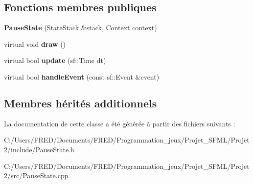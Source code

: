 \subsection*{Fonctions membres publiques}
\begin{DoxyCompactItemize}
\item 
{\bfseries Pause\+State} (\hyperlink{class_state_stack}{State\+Stack} \&stack, \hyperlink{struct_state_1_1_context}{Context} context)\hypertarget{class_pause_state_ac5c14226e18f688233f5b511e1025a59}{}\label{class_pause_state_ac5c14226e18f688233f5b511e1025a59}

\item 
virtual void {\bfseries draw} ()\hypertarget{class_pause_state_ac4c159c2f6d32eedd351f39e36c43f9d}{}\label{class_pause_state_ac4c159c2f6d32eedd351f39e36c43f9d}

\item 
virtual bool {\bfseries update} (sf\+::\+Time dt)\hypertarget{class_pause_state_a9d6e9c6d96e140487badbe1da2738fa3}{}\label{class_pause_state_a9d6e9c6d96e140487badbe1da2738fa3}

\item 
virtual bool {\bfseries handle\+Event} (const sf\+::\+Event \&event)\hypertarget{class_pause_state_a685dda66dca3e1c41f4cb02da93c5a8d}{}\label{class_pause_state_a685dda66dca3e1c41f4cb02da93c5a8d}

\end{DoxyCompactItemize}
\subsection*{Membres hérités additionnels}


La documentation de cette classe a été générée à partir des fichiers suivants \+:\begin{DoxyCompactItemize}
\item 
C\+:/\+Users/\+F\+R\+E\+D/\+Documents/\+F\+R\+E\+D/\+Programmation\+\_\+jeux/\+Projet\+\_\+\+S\+F\+M\+L/\+Projet2/include/Pause\+State.\+h\item 
C\+:/\+Users/\+F\+R\+E\+D/\+Documents/\+F\+R\+E\+D/\+Programmation\+\_\+jeux/\+Projet\+\_\+\+S\+F\+M\+L/\+Projet2/src/Pause\+State.\+cpp\end{DoxyCompactItemize}

